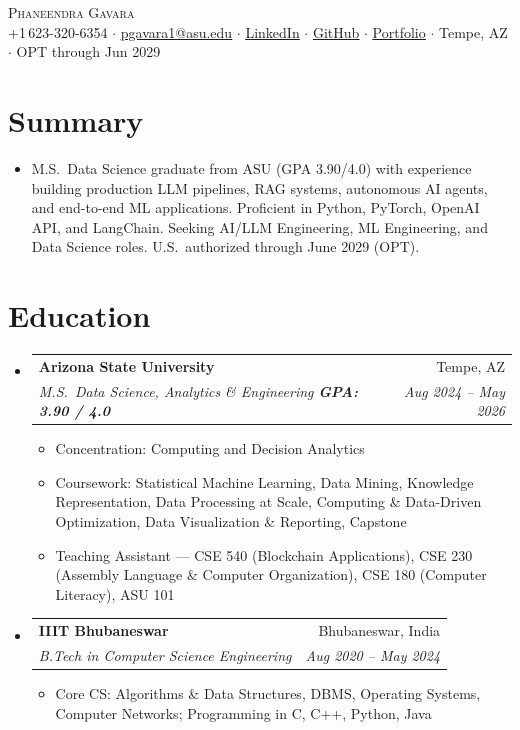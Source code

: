 \documentclass[letterpaper,10pt]{article}
\makeatletter
\newcommand{\resumeItem}[1]{\item\small{#1\vspace{-2pt}}}
\newcommand{\resumeSubheading}[4]{
  \vspace{-2pt}\item
  \begin{tabular*}{0.97\textwidth}[t]{l@{\extracolsep{\fill}}r}
    \textbf{\small#1} & \small#2 \\
    \textit{\small#3} & \textit{\small#4} \\
  \end{tabular*}\vspace{-6pt}
}
\newcommand{\resumeSubHL}{\begin{itemize}[leftmargin=0.12in,label={}]}
\newcommand{\resumeSubHLE}{\end{itemize}}
\newcommand{\resumeIL}{\begin{itemize}[leftmargin=0.18in,topsep=1pt,itemsep=0pt]}
\newcommand{\resumeILE}{\end{itemize}\vspace{-3pt}}
\makeatother
\begin{document}
\begin{center}
  {\LARGE\scshape Phaneendra Gavara}\\[3pt]
  \small
  +1\,623-320-6354 $\cdot$
  \href{mailto:pgavara1@asu.edu}{\underline{pgavara1@asu.edu}} $\cdot$
  \href{https://www.linkedin.com/in/phaneendra-gavara}{\underline{LinkedIn}} $\cdot$
  \href{https://github.com/PHANI465}{\underline{GitHub}} $\cdot$
  \href{https://phaneendragavara.dev/}{\underline{Portfolio}} $\cdot$
  Tempe, AZ $\cdot$ OPT through Jun 2029
\end{center}

\vspace{-2pt}

\section{Summary}
\begin{itemize}[leftmargin=0.12in,label={},topsep=0pt]
  \small\item{
    M.S.\ Data Science graduate from ASU (GPA 3.90/4.0) with experience building production LLM pipelines, RAG systems, autonomous AI agents, and end-to-end ML applications. Proficient in Python, PyTorch, OpenAI API, and LangChain. Seeking AI/LLM Engineering, ML Engineering, and Data Science roles. U.S.\ authorized through June 2029 (OPT).
  }
\end{itemize}

\section{Education}
\resumeSubHL
  \resumeSubheading
    {Arizona State University}{Tempe, AZ}
    {M.S.\ Data Science, Analytics \& Engineering \quad \textbf{GPA: 3.90 / 4.0}}{Aug 2024 -- May 2026}
    \resumeIL
      \resumeItem{Concentration: Computing and Decision Analytics}
      \resumeItem{Coursework: Statistical Machine Learning, Data Mining, Knowledge Representation, Data Processing at Scale, Computing \& Data-Driven Optimization, Data Visualization \& Reporting, Capstone}
      \resumeItem{Teaching Assistant --- CSE 540 (Blockchain Applications), CSE 230 (Assembly Language \& Computer Organization), CSE 180 (Computer Literacy), ASU 101}
    \resumeILE
  \resumeSubheading
    {IIIT Bhubaneswar}{Bhubaneswar, India}
    {B.Tech in Computer Science Engineering}{Aug 2020 -- May 2024}
    \resumeIL
      \resumeItem{Core CS: Algorithms \& Data Structures, DBMS, Operating Systems, Computer Networks; Programming in C, C++, Python, Java}
    \resumeILE
\resumeSubHLE
\end{document}
